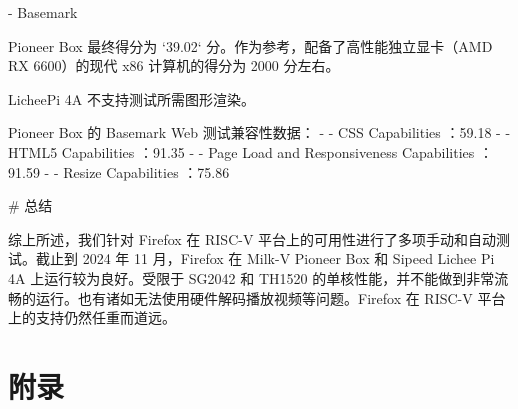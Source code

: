 \documentclass{article}
\begin{document}
\begin{markdown}
- Basemark

Pioneer Box 最终得分为 `39.02` 分。作为参考，配备了高性能独立显卡（AMD RX 6600）的现代 x86 计算机的得分为 2000 分左右。

LicheePi 4A 不支持测试所需图形渲染。

Pioneer Box 的 Basemark Web 测试兼容性数据：
- - CSS Capabilities ：59.18%
- - HTML5 Capabilities ：91.35%
- - Page Load and Responsiveness Capabilities ：91.59%
- - Resize Capabilities ：75.86%

# 总结

综上所述，我们针对 Firefox 在 RISC-V 平台上的可用性进行了多项手动和自动测试。截止到 2024 年 11 月，Firefox 在 Milk-V Pioneer Box 和 Sipeed Lichee Pi 4A 上运行较为良好。受限于 SG2042 和 TH1520 的单核性能，并不能做到非常流畅的运行。也有诸如无法使用硬件解码播放视频等问题。Firefox 在 RISC-V 平台上的支持仍然任重而道远。


\end{markdown}

\newpage
\section*{附录}

\appendix

\end{document}
